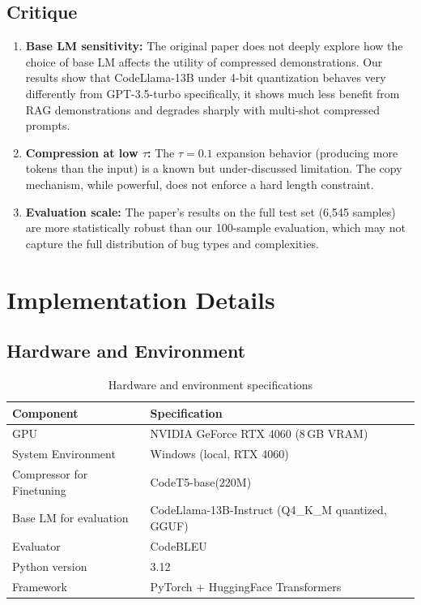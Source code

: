 \documentclass[11pt,a4paper]{article}
\begin{document}
\subsection*{Critique}

\begin{enumerate}[leftmargin=1.5em]
  \item \textbf{Base LM sensitivity:} The original paper does not deeply explore how the choice of base LM affects the utility of compressed demonstrations. Our results show that CodeLlama-13B under 4-bit quantization behaves very differently from GPT-3.5-turbo specifically, it shows much less benefit from RAG demonstrations and degrades sharply with multi-shot compressed prompts.

  \item \textbf{Compression at low $\tau$:} The $\tau=0.1$ expansion behavior (producing more tokens than the input) is a known but under-discussed limitation. The copy mechanism, while powerful, does not enforce a hard length constraint.

  \item \textbf{Evaluation scale:} The paper's results on the full test set (6,545 samples) are more statistically robust than our 100-sample evaluation, which may not capture the full distribution of bug types and complexities.
\end{enumerate}

\section{Implementation Details}

\subsection{Hardware and Environment}

\begin{table}[H]
  \centering
  \caption{Hardware and environment specifications}
  \label{tab:hardware}
  \renewcommand{\arraystretch}{1.15}
  \begin{tabularx}{\textwidth}{L{4.5cm} X}
    \toprule
    \textbf{Component} & \textbf{Specification} \\
    \midrule
    GPU                       & NVIDIA GeForce RTX 4060 (8\,GB VRAM) \\
    System Environment        & Windows (local, RTX 4060) \\
    Compressor for Finetuning    & CodeT5-base(220M) \\
    Base LM for evaluation    & CodeLlama-13B-Instruct (Q4\_K\_M quantized, GGUF) \\
    Evaluator    & CodeBLEU \\
    Python version            & 3.12 \\
    Framework                 & PyTorch + HuggingFace Transformers \\
    \bottomrule
  \end{tabularx}
\end{table}
\end{document}
